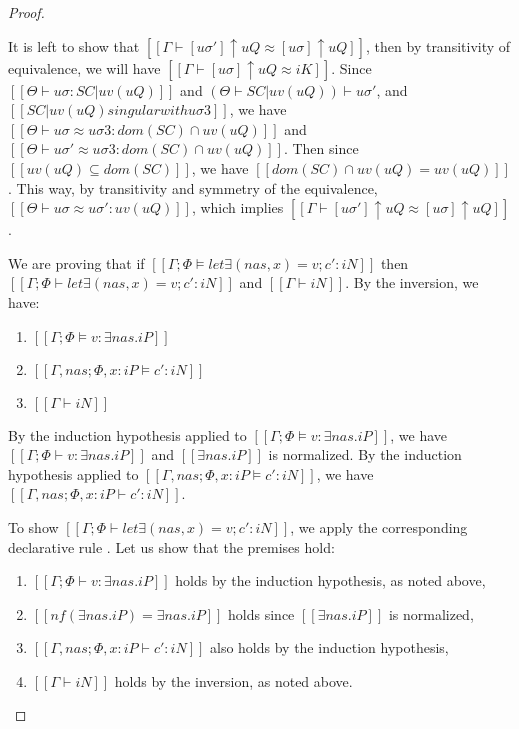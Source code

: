 \begin{proof}
\begin{caseof}
\begin{itemize}
                    It is left to show that $[[Γ ⊢ [uσ']↑uQ ≈ [uσ]↑uQ]]$, 
                    then by transitivity of equivalence, we will have $[[Γ ⊢ [uσ]↑uQ ≈ iK]]$.
                    Since $[[ Θ   ⊢ uσ : SC|uv(uQ) ]]$ and $(Θ  ⊢ SC|uv(uQ)) ⊢ uσ'$, 
                    and $[[SC|uv(uQ) singular with uσ3]]$, we have 
                    $[[Θ ⊢ uσ ≈ uσ3 : dom(SC) ∩ uv(uQ)]]$
                    and $[[Θ ⊢ uσ' ≈ uσ3 : dom(SC) ∩ uv(uQ)]]$.
                    Then since $[[uv(uQ) ⊆ dom(SC)]]$, we have $[[dom(SC) ∩ uv(uQ) = uv(uQ)]]$.
                    This way, by transitivity and symmetry of the equivalence, 
                    $[[Θ ⊢ uσ ≈ uσ' : uv(uQ)]]$, which implies
                    $[[Γ ⊢ [uσ']↑uQ ≈ [uσ]↑uQ]]$. 
            \end{itemize}

        \item {}
            We are proving that if 
            $[[Γ; Φ ⊨ let∃ (nas, x) = v; c' : iN]]$
            then
            $[[Γ ; Φ ⊢ let∃ (nas, x) = v; c' : iN]]$ and
            $[[Γ ⊢ iN]]$.
            By the inversion, we have:
            \begin{enumerate}
                \item $[[Γ; Φ ⊨ v : ∃nas.iP]]$
                \item $[[Γ, nas ; Φ, x:iP ⊨ c' : iN]]$
                \item $[[Γ ⊢ iN]]$
            \end{enumerate}

            By the induction hypothesis applied to 
            $[[Γ; Φ ⊨ v : ∃nas.iP]]$, we have $[[Γ; Φ ⊢ v : ∃nas.iP]]$
            and $[[∃nas.iP]]$ is normalized.
            By the induction hypothesis applied to
            $[[Γ, nas ; Φ, x:iP ⊨ c' : iN]]$, we have $[[Γ, nas ; Φ, x:iP ⊢ c' : iN]]$.

            To show $[[Γ; Φ ⊢ let∃ (nas, x) = v; c' : iN]]$, we apply the corresponding
            declarative rule . Let us show that the premises hold:
            \begin{enumerate}
                \item $[[Γ ; Φ ⊢ v : ∃nas.iP]]$ holds by the induction hypothesis, as noted above,
                \item $[[nf(∃nas.iP) = ∃nas.iP]]$ holds since $[[∃nas.iP]]$ is normalized,
                \item $[[Γ, nas ; Φ, x:iP ⊢ c' : iN]]$ also holds by the induction hypothesis,
                \item $[[Γ ⊢ iN]]$ holds by the inversion, as noted above.
            \end{enumerate}


\end{caseof}
\end{proof}
